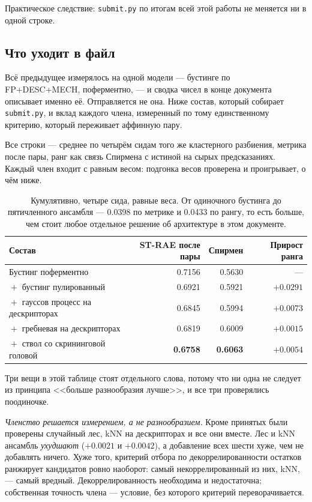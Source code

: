 Практическое следствие: \texttt{submit.py} по итогам всей этой работы не меняется ни в одной
строке.

\subsection{Что уходит в файл}
\label{sec:submitted}

Всё предыдущее измерялось на одной модели --- бустинге по FP+DESC+MECH, поферментно, --- и
сводка чисел в конце документа описывает именно её. Отправляется не она. Ниже состав, который
собирает \texttt{submit.py}, и вклад каждого члена, измеренный по тому единственному критерию,
который переживает аффинную пару.

Все строки --- среднее по четырём сидам того же кластерного разбиения, метрика после пары,
ранг как связь Спирмена с истиной на сырых предсказаниях. Каждый член входит с равным весом:
подгонка весов проверена и проигрывает, о чём ниже.

\begin{table}[htbp]\centering\small
\begin{tabularx}{0.9\textwidth}{@{}Xrrr@{}}
\toprule
Состав & ST-RAE после пары & Спирмен & Прирост ранга \\
\midrule
Бустинг поферментно                    & 0.7156 & 0.5630 & --- \\
${}+{}$ бустинг пулированный           & 0.6921 & 0.5921 & $+0.0291$ \\
${}+{}$ гауссов процесс на дескрипторах & 0.6845 & 0.5994 & $+0.0073$ \\
${}+{}$ гребневая на дескрипторах       & 0.6819 & 0.6009 & $+0.0015$ \\
${}+{}$ ствол со скрининговой головой   & \textbf{0.6758} & \textbf{0.6063} & $+0.0054$ \\
\bottomrule
\end{tabularx}
\caption{Кумулятивно, четыре сида, равные веса. От одиночного бустинга до пятичленного
ансамбля --- 0.0398 по метрике и 0.0433 по рангу, то есть больше, чем стоит любое отдельное
решение об архитектуре в этом документе.}
\label{tab:ensemble}
\end{table}

Три вещи в этой таблице стоят отдельного слова, потому что ни одна не следует из принципа
<<больше разнообразия лучше>>, и все три проверялись поодиночке.

\emph{Членство решается измерением, а не разнообразием.} Кроме принятых были проверены
случайный лес, kNN на дескрипторах и все они вместе. Лес и kNN ансамбль \emph{ухудшают}
($+0.0021$ и $+0.0042$), а добавление всех шести хуже, чем не добавлять ничего. Хуже того,
критерий отбора по декоррелированности остатков ранжирует кандидатов ровно наоборот: самый
некоррелированный из них, kNN, --- самый вредный. Декоррелированность необходима и
недостаточна; собственная точность члена --- условие, без которого критерий переворачивается.

